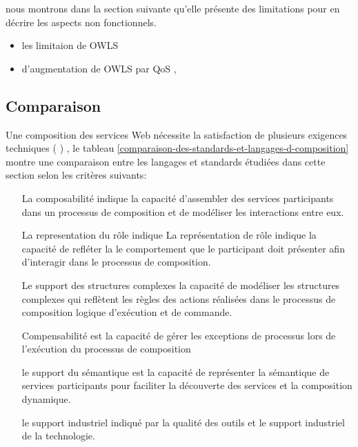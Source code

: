 {      nous montrons dans la section suivante qu’elle présente des
      limitations pour en décrire les aspects non
      fonctionnels.\cite{jean2012prise}

      \begin{itemize}
        \item les limitaion de OWLS \cite{jean2012prise}
        \item d'augmentation de OWLS par QoS \cite{baryannis2010},
          \cite{kritikos2009requirements}
      \end{itemize}
    }

    \subsection{Comparaison}
    \label{sec:langs-comparaison}   
    Une composition des services Web nécessite la satisfaction de
    plusieurs exigences techniques (\cite{sheng2014web}
    \cite{bucchiarone2006survey}) , le tableau
    \ref{comparaison-des-standards-et-langages-d-composition} montre
    une comparaison entre les langages et standards étudiées dans
    cette section selon les critères suivants:
    
    \SpecialItem
    \begin{itemize}
      \item [La composabilité] indique la capacité
        d'assembler des services participants dans un processus de
        composition et de modéliser les interactions entre eux.

      \item [La representation du rôle] indique La représentation de
        rôle indique la capacité de refléter la le comportement que le
        participant doit présenter afin d'interagir dans le processus
        de composition.

      \item [Le support des structures complexes] la capacité de
        modéliser les structures complexes qui reflètent les règles
        des actions réalisées dans le processus de composition logique
        d'exécution et de commande.

      \item [Compensabilité] est la capacité de gérer les
        exceptions de processus lors de l'exécution du processus de
        composition

      \item [le support du sémantique] est la capacité de représenter
        la sémantique de services participants pour faciliter la
        découverte des services et la composition dynamique.

      \item [le support industriel] indiqué par la qualité des outils
        et le support industriel de la technologie.
    \end{itemize}

